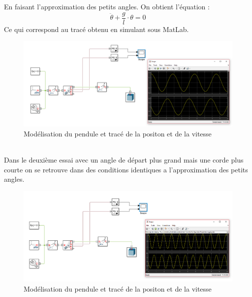\documentclass[12pt,a4paper]{article}
\begin{document}
En faisant l'approximation des petits angles. On obtient l'équation :
\[ \ddot{\theta} + \dfrac{g}{l} \cdot \theta = 0 \]
Ce qui correspond au tracé obtenu en simulant sous MatLab. \\
\begin{figure}[h!]
\centering
\includegraphics[width=.9\linewidth]{pendule1.png}
\caption{Modélisation du pendule et tracé de la positon et de la vitesse}
\end{figure}
\\
Dans le deuxième essai avec un angle de départ plus grand mais une corde plus courte on se retrouve dans des conditions identiques a l'approximation des petits angles.


\begin{figure}[h!]
\centering
\includegraphics[width=.9\linewidth]{pendule2.png}
\caption{Modélisation du pendule et tracé de la positon et de la vitesse}
\end{figure}
\end{document}
